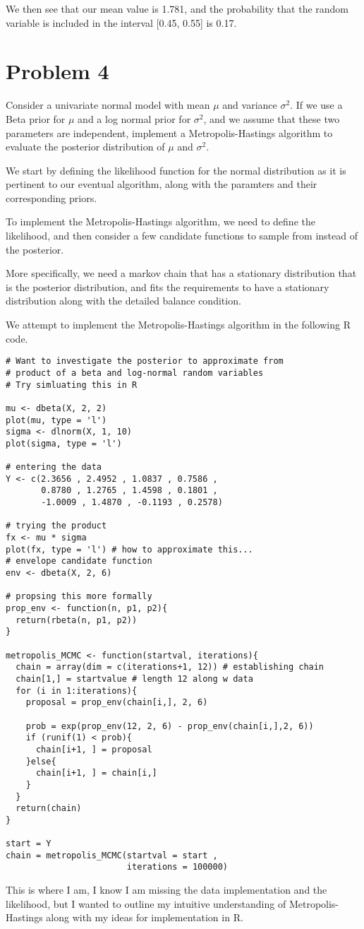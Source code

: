 \documentclass[12pt, letterpaper]{article}
\begin{document}
We then see that our mean value is 1.781, and the probability that the random variable is included in the interval [0.45, 0.55] is 0.17. 

\section{Problem 4} 

Consider a univariate normal model with mean $\mu$ and variance $\sigma^2$.  If we use a Beta prior for $\mu$ and a log normal prior for $\sigma^2$, and we assume that these two parameters are independent, implement a Metropolis-Hastings algorithm to evaluate the posterior distribution of $\mu$ and $\sigma^2$. 

We start by defining the likelihood function for the normal distribution as it is pertinent to our eventual algorithm, along with the paramters and their corresponding priors. 

To implement the Metropolis-Hastings algorithm, we need to define the likelihood, and then consider a few candidate functions to sample from instead of the posterior. 

More specifically, we need a markov chain that has a stationary distribution that is the posterior distribution, and fits the requirements to have a stationary distribution along with the detailed balance condition. 

We attempt to implement the Metropolis-Hastings algorithm in the following R code. 

\begin{verbatim}
# Want to investigate the posterior to approximate from 
# product of a beta and log-normal random variables 
# Try simluating this in R 

mu <- dbeta(X, 2, 2)
plot(mu, type = 'l')
sigma <- dlnorm(X, 1, 10)
plot(sigma, type = 'l')

# entering the data 
Y <- c(2.3656 , 2.4952 , 1.0837 , 0.7586 , 
       0.8780 , 1.2765 , 1.4598 , 0.1801 , 
       -1.0009 , 1.4870 , -0.1193 , 0.2578)

# trying the product 
fx <- mu * sigma
plot(fx, type = 'l') # how to approximate this...
# envelope candidate function 
env <- dbeta(X, 2, 6)

# propsing this more formally 
prop_env <- function(n, p1, p2){
  return(rbeta(n, p1, p2))
}

metropolis_MCMC <- function(startval, iterations){
  chain = array(dim = c(iterations+1, 12)) # establishing chain
  chain[1,] = startvalue # length 12 along w data
  for (i in 1:iterations){
    proposal = prop_env(chain[i,], 2, 6)
    
    prob = exp(prop_env(12, 2, 6) - prop_env(chain[i,],2, 6))
    if (runif(1) < prob){
      chain[i+1, ] = proposal
    }else{
      chain[i+1, ] = chain[i,]
    }
  }
  return(chain)
}

start = Y
chain = metropolis_MCMC(startval = start , 
                        iterations = 100000)
\end{verbatim} 

This is where I am, I know I am missing the data implementation and the likelihood, but I wanted to outline my intuitive understanding of Metropolis-Hastings along with my ideas for implementation in R. 
\end{document}
